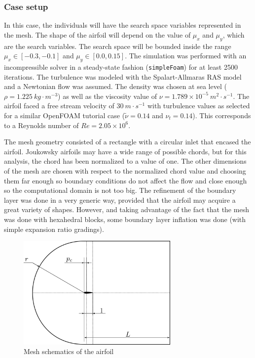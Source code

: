 \newpage

\subsubsection*{Case setup}

In this case, the individuals will have the search space variables represented in the mesh. The shape of the airfoil will depend on the value of $\mu_x$ and $\mu_y$, which are the search variables. The search space will be bounded inside the range $\mu_x\in[-0.3,-0.1]$ and $\mu_y\in[0.0,0.15]$. The simulation was performed with an incompressible solver in a steady-state fashion (\texttt{simpleFoam}) for at least 2500 iterations. The turbulence was modeled with the Spalart-Allmaras RAS model and a Newtonian flow was assumed. The density was chosen at sea level ($\rho=1.225\ kg\cdot m^{-3}$) as well as the viscosity value of $\nu=1.789\times10^{-5}\ m^2\cdot s^{-1}$. The airfoil faced a free stream velocity of $30\ m\cdot s^{-1}$ with turbulence values as selected for a similar OpenFOAM tutorial case ($\tilde{\nu}=0.14$ and $\nu_t =0.14$). This corresponds to a Reynolds number of $Re=2.05\times10^6$.

The mesh geometry consisted of a rectangle with a circular inlet that encased the airfoil. Joukowsky airfoils may have a wide range of possible chords, but for this analysis, the chord has been normalized to a value of one. The other dimensions of the mesh are chosen with respect to the normalized chord value and choosing them far enough so boundary conditions do not affect the flow and close enough so the computational domain is not too big. The refinement of the boundary layer was done in a very generic way, provided that the airfoil may acquire a great variety of shapes. However, and taking advantage of the fact that the mesh was done with hexahedral blocks, some boundary layer inflation was done (with simple expansion ratio gradings). 


     \begin{figure}[h!]
        \centering
        \includegraphics[width=0.7\textwidth]{Figures/3/airfoil2dReport.png}
        \caption{Mesh schematics of the airfoil}
        \label{fig:airofilMesh}
    \end{figure}

